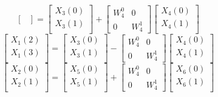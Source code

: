 \documentclass[journal,12pt,twocolumn]{IEEEtran}
\renewcommand\thesection{\arabic{section}}
\begin{document}
\begin{enumerate}[label=\thesection.\arabic*.,ref=\thesection.\theenumi]
\begin{equation}
\begin{bmatrix}
\end{bmatrix}
=
\begin{bmatrix}
X_{3}(0) \\ 
X_{3}(1)\\ 
\end{bmatrix}
+
\begin{bmatrix}
W^{0}_{4} & 0\\
0 & W^{1}_{4}
\end{bmatrix}
\begin{bmatrix}
X_{4}(0) \\ 
X_{4}(1) \\ 
\end{bmatrix}
\end{equation}
\begin{equation}
\begin{bmatrix}
X_{1}(2) \\ 
X_{1}(3)\\ 
\end{bmatrix}
=
\begin{bmatrix}
X_{3}(0) \\ 
X_{3}(1)\\ 
\end{bmatrix}
-
\begin{bmatrix}
W^{0}_{4} & 0\\
0 & W^{1}_{4}
\end{bmatrix}
\begin{bmatrix}
X_{4}(0) \\ 
X_{4}(1) \\ 
\end{bmatrix}
\end{equation}
\begin{equation}
\begin{bmatrix}
X_{2}(0) \\ 
X_{2}(1)\\ 
\end{bmatrix}
=
\begin{bmatrix}
X_{5}(0) \\ 
X_{5}(1)\\ 
\end{bmatrix}
+
\begin{bmatrix}
W^{0}_{4} & 0\\
0 & W^{1}_{4}
\end{bmatrix}
\begin{bmatrix}
X_{6}(0) \\ 
X_{6}(1) \\ 
\end{bmatrix}
\end{equation}

\end{enumerate}
\end{document}
